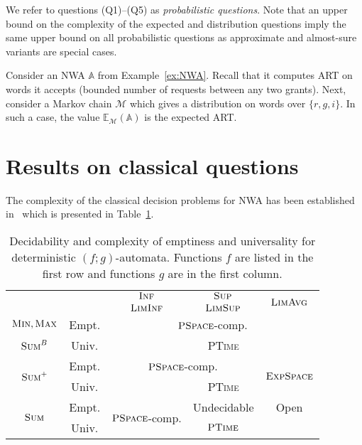 \documentclass{lmcs}
\newcommand{\nestedA}{\mathbb{A}}
\newcommand{\PTIME}{\textsc{PTime}{}}
\newcommand{\PSPACE}{\textsc{PSpace}{}}
\newcommand{\EXPSPACE}{\textsc{ExpSpace}{}}
\newcommand{\fsum}{\textsc{Sum}}
\newcommand{\fBsum}[1]{\textsc{Sum}^{#1}}
\newcommand{\fmax}{\textsc{Max}}
\newcommand{\fmin}{\textsc{Min}}
\newcommand{\flimavg}{\textsc{LimAvg}}
\newcommand{\fliminf}{\textsc{LimInf}}
\newcommand{\flimsup}{\textsc{LimSup}}
\newcommand{\fsup}{\textsc{Sup}}
\newcommand{\finf}{\textsc{Inf}}
\newcommand{\expected}{\mathbb{E}}
\newcommand{\markov}{\mathcal{M}}
\begin{document}
\noindent
We refer to questions (Q1)--(Q5) as \emph{probabilistic questions}. Note that an upper bound on the complexity of the expected and distribution questions imply the same upper bound on all probabilistic questions as approximate and almost-sure variants are special cases.

\begin{exa}
Consider an NWA $\nestedA$ from Example~\ref{ex:NWA}. Recall that it computes ART on words it accepts (bounded number of requests between any two grants).
Next, consider a Markov chain $\markov$ which gives a distribution on words over $\{r,g,i\}$.
In such a case, the value $\expected_{\markov}(\nestedA)$ is the expected ART\@.
\end{exa}



\section{Results on classical questions}
	\smallskip{}
The complexity of the classical decision problems for NWA
has been established in~\cite{nested} which is presented in Table~\ref{tab1}.
\begin{table}[t]
\centering
\def\tabcolsep{5pt}
\begin{tabular}{|c|c|c|c|c|} \hline \multicolumn{2}{|c|}{}& $\finf$& $\fsup$ & \multirow{2}{*}{$\flimavg$} \\
\multicolumn{2}{|c|}{}& $\fliminf$ & $\flimsup$  & \\
\hline $\fmin, \fmax$ &Empt.&
\multicolumn{3}{|c|}{ {$\PSPACE$-comp.}}  \\
\cline{2-2}
\cline{4-4}
$\fBsum{B}$ &Univ.&  &\PTIME&  \\
\hline \multirow{2}{*}{$\fsum^+$} & Empt. &
\multicolumn{2}{|c|}{ {$\PSPACE$-comp.}} &
\multirow{2}{*}{$\EXPSPACE$ } \\
\cline{2-2}
\cline{4-4}
&Univ. & &\PTIME&    \\
\hline \multirow{2}{*}{$\fsum$} & Empt. & \multirow{2}{*}{$\PSPACE$-comp.}  & Undecidable & Open \\
\cline{2-2}
\cline{4-4}
& Univ. &  & $\PTIME$  &  \\
\hline \end{tabular}
\caption{Decidability and complexity of emptiness and universality for deterministic $(f;g)$-automata.
Functions $f$ are listed in the first row and functions $g$ are in the first column.
}\label{tab1}
\end{table}
\end{document}
